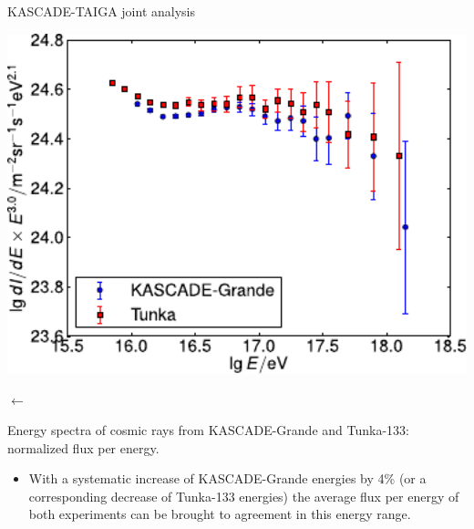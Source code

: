 \begin{frame}{KASCADE-TAIGA joint analysis}
\small
\begin{center}
    \begin{minipage}{0.55\textwidth}
     	\includegraphics[width=1\textwidth]{pics/KG_tunka133_scales.pdf}
    \end{minipage}
     $\longleftarrow$ 
\begin{minipage}{0.38\textwidth}	
  Energy spectra of cosmic rays from KASCADE-Grande and Tunka-133: normalized flux per energy.
\end{minipage}
\end{center}

\begin{itemize}
 \item  With a systematic increase of
KASCADE-Grande energies by 4\% (or a corresponding decrease of Tunka-133 energies) 
the average flux per energy of both experiments can be brought to agreement
in this energy range.
\end{itemize}
\end{frame}

